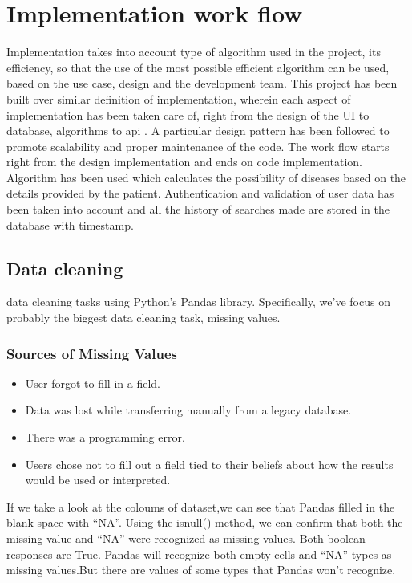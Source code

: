 \documentclass[oneside,12pt]{Classes/VTU}
\begin{document}
	\section{Implementation work flow}
	Implementation takes into account type of algorithm used in the project, its efficiency, so that the use of the most possible efficient algorithm can be used, based on the use case, design and the development team. This project has been built over similar definition of implementation, wherein each aspect of implementation has been taken care of, right from the design of the UI to database, algorithms to api . A particular design pattern has been followed to promote scalability and proper maintenance of the code. The work flow starts right from the design implementation and ends on code implementation. Algorithm has been used which calculates the possibility of diseases based on the details provided by the patient. Authentication and validation of user data has been taken into account and all the history of searches made are stored in the database with timestamp.
	\subsection{Data cleaning}
	data cleaning tasks using Python’s Pandas library. Specifically, we’ve focus on probably the biggest data cleaning task, missing values.
	\subsubsection{Sources of Missing Values}
	\begin{itemize}
		\item User forgot to fill in a field.
		\item Data was lost while transferring manually from a legacy database.
		\item There was a programming error.
		\item Users chose not to fill out a field tied to their beliefs about how the results would be used or interpreted. 
	\end{itemize}
	If we take a look at the coloums of dataset,we can see that Pandas filled in the blank space with “NA”. Using the isnull() method, we can confirm that both the missing value and “NA” were recognized as missing values. Both boolean responses are True. Pandas will recognize both empty cells and “NA” types as missing values.But there are values of some types that Pandas won’t recognize.
\end{document}
